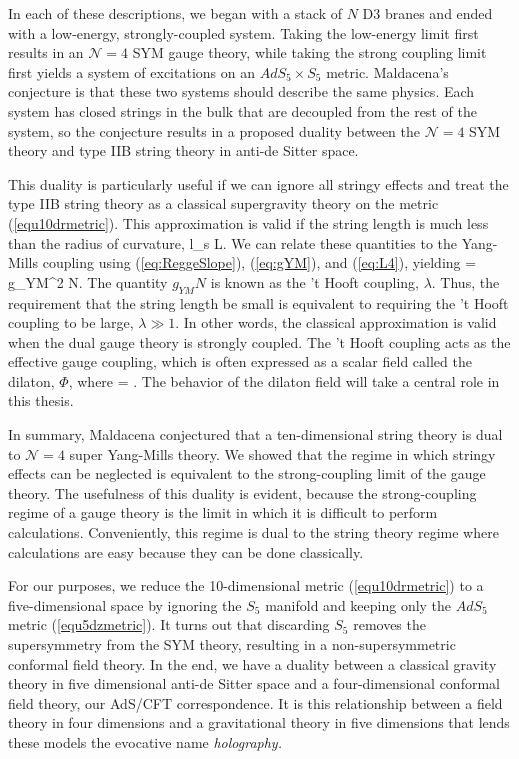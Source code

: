 In each of these descriptions, we began with a stack of $N$ D3 branes and ended with a low-energy, strongly-coupled system.
Taking the low-energy limit first results in an $\mathcal{N}=4$ SYM gauge theory, while taking the strong coupling limit first yields a system of excitations on an $AdS_5 \times S_5$ metric.
Maldacena's conjecture is that these two systems should describe the same physics.
Each system has closed strings in the bulk that are decoupled from the rest of the system, so the conjecture results in a proposed duality between the $\mathcal{N}=4$ SYM theory and type IIB string theory in anti-de Sitter space.

This duality is particularly useful if we can ignore all stringy effects and treat the type IIB string theory as a classical supergravity theory on the metric (\ref{equ10drmetric}). 
This approximation is valid if the string length is much less than the radius of curvature,
\be
l_s \ll L.
\ee
We can relate these quantities to the Yang-Mills coupling using (\ref{eq:ReggeSlope}), (\ref{eq:gYM}), and (\ref{eq:L4}), yielding
\be
{} = g_{YM}^2 N.
\ee
The quantity $g_{YM} N$ is known as the 't Hooft coupling, $\lambda$.
Thus, the requirement that the string length be small is equivalent to requiring the 't Hooft coupling to be large, $\lambda \gg 1$.
In other words, the classical approximation is valid when the dual gauge theory is strongly coupled.
The 't Hooft coupling acts as the effective gauge coupling, which is often expressed as a scalar field called the dilaton, $\Phi$, where
\be
\Phi = \log \lambda.
\ee
The behavior of the dilaton field will take a central role in this thesis.

In summary, Maldacena conjectured that a ten-dimensional string theory is dual to $\mathcal{N} = 4 $ super Yang-Mills theory.
We showed that the regime in which stringy effects can be neglected is equivalent to the strong-coupling limit of the gauge theory.
The usefulness of this duality is evident, because the strong-coupling regime of a gauge theory is the limit in which it is difficult to perform calculations.
Conveniently, this regime is dual to the string theory regime where calculations are easy because they can be done classically.

For our purposes, we reduce the 10-dimensional metric (\ref{equ10drmetric}) to a five-dimensional space by ignoring the $S_5$ manifold and keeping only the $AdS_5$ metric (\ref{equ5dzmetric}).
It turns out that discarding $S_5$ removes the supersymmetry from the SYM theory, resulting in a non-supersymmetric conformal field theory.
In the end, we have a duality between a classical gravity theory in five dimensional anti-de Sitter space and a four-dimensional conformal field theory, our AdS/CFT correspondence.
It is this relationship between a field theory in four dimensions and a gravitational theory in five dimensions that lends these models the evocative name \it{holography}.

